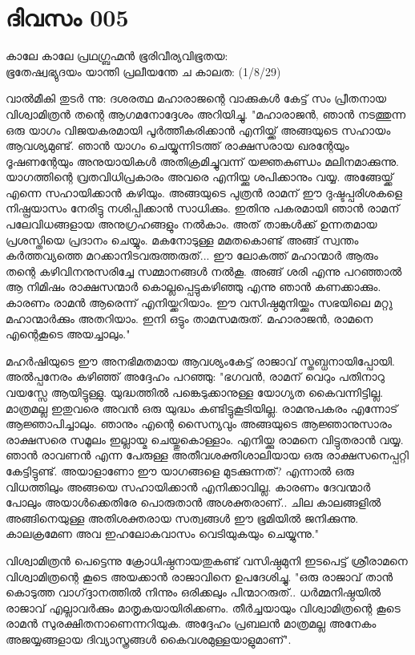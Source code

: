 \newpage
\section{ദിവസം 005}

\begin{center}
കാലേ കാലേ പ്രഥഗ്ബ്രഹ്മൻ ഭൂരിവീര്യവിഭൂതയ:\\
ഭൂതേഷ്വഭ്യുദയം യാന്തി പ്രലീയന്തേ ച കാലത:  (1/8/29)\\
\end{center}

വാല്‍മീകി തുടര്‍ ന്നു: ദശരത്ഥ മഹാരാജന്റെ വാക്കുകള്‍ കേട്ട്‌ സം പ്രീതനായ വിശ്വാമിത്രന്‍ തന്റെ ആഗമനോദ്ദേശം അറിയിച്ചു. "മഹാരാജന്‍, ഞാന്‍ നടത്തുന്ന ഒരു യാഗം വിജയകരമായി പൂര്‍ത്തീകരിക്കാന്‍ എനിയ്ക്ക്‌ അങ്ങയുടെ സഹായം ആവശ്യമുണ്ട്‌. ഞാന്‍ യാഗം ചെയ്യുന്നിടത്ത്‌ രാക്ഷസരായ ഖരന്റേയും ദൂഷണന്റേയും അനുയായികള്‍ അതിക്രമിച്ചുവന്ന് യജ്ഞകുണ്ഡം മലിനമാക്കുന്നു. യാഗത്തിന്റെ വ്രതവിധിപ്രകാരം അവരെ എനിയ്ക്കു ശപിക്കാനും വയ്യ. അങ്ങേയ്ക്ക്‌ എന്നെ സഹായിക്കാന്‍ കഴിയും. അങ്ങയുടെ പുത്രന്‍ രാമന്‌ ഈ ദുഷ്ടപ്പരിശകളെ നിഷ്പ്രയാസം നേരിട്ടു നശിപ്പിക്കാന്‍ സാധിക്കും. ഇതിനു പകരമായി ഞാന്‍ രാമന്‌ പലേവിധങ്ങളായ അനുഗ്രഹങ്ങളും നല്‍കാം. അത്‌ താങ്കള്‍ക്ക്‌ ഉന്നതമായ പ്രശസ്തിയെ പ്രദാനം ചെയ്യും. മകനോടുള്ള മമതകൊണ്ട്‌ അങ്ങ്‌ സ്വന്തം കര്‍ത്തവ്യത്തെ മറക്കാനിടവരുത്തരുത്‌... ഈ ലോകത്ത്‌ മഹാന്മാര്‍ ആരും തന്റെ കഴിവിനനുസരിച്ചേ സമ്മാനങ്ങള്‍ നല്‍കൂ. അങ്ങ്‌ ശരി എന്നു പറഞ്ഞാല്‍ ആ നിമിഷം രാക്ഷസന്മാര്‍ കൊല്ലപ്പെട്ടുകഴിഞ്ഞു എന്നു ഞാന്‍ കണക്കാക്കും. കാരണം രാമന്‍ ആരെന്ന് എനിയ്ക്കറിയാം. ഈ വസിഷ്ഠമുനിയ്ക്കും സഭയിലെ മറ്റു മഹാന്മാര്‍ക്കും അതറിയാം. ഇനി ഒട്ടും താമസമരുത്‌. മഹാരാജന്‍, രാമനെ എന്റെകൂടെ അയച്ചാലും."

മഹര്‍ഷിയുടെ ഈ അനഭിമതമായ ആവശ്യംകേട്ട്‌ രാജാവ്‌ സ്തബ്ധനായിപ്പോയി. അല്‍പ്പനേരം കഴിഞ്ഞ്‌ അദ്ദേഹം പറഞ്ഞു: "ഭഗവന്‍, രാമന്‌ വെറും പതിനാറു വയസ്സേ ആയിട്ടുള്ളു. യുദ്ധത്തില്‍ പങ്കെടുക്കാനുള്ള യോഗ്യത കൈവന്നിട്ടില്ല. മാത്രമല്ല ഇതുവരെ അവന്‍ ഒരു യുദ്ധം കണ്ടിട്ടുകൂടിയില്ല. രാമനുപകരം എന്നോട്‌ ആജ്ഞാപിച്ചാലും. ഞാനും എന്റെ സൈന്യവും അങ്ങയുടെ ആജ്ഞാനുസാരം രാക്ഷസരെ സമൂലം ഇല്ലായ്മ ചെയ്തുകൊള്ളാം. എനിയ്ക്കു രാമനെ വിട്ടുതരാന്‍ വയ്യ. ഞാന്‍ രാവണന്‍ എന്ന പേരുള്ള അതീവശക്തിശാലിയായ ഒരു രാക്ഷസനെപ്പറ്റി കേട്ടിട്ടുണ്ട്‌. അയാളാണോ ഈ യാഗങ്ങളെ മുടക്കുന്നത്‌? എന്നാല്‍ ഒരു വിധത്തിലും അങ്ങയെ സഹായിക്കാന്‍ എനിക്കാവില്ല. കാരണം ദേവന്മാര്‍ പോലും അയാള്‍ക്കെതിരേ പൊരുതാന്‍ അശക്തരാണ്‌.. ചില കാലങ്ങളില്‍ അങ്ങിനെയുള്ള അതിശക്തരായ സത്വങ്ങള്‍ ഈ ഭൂമിയില്‍ ജനിക്കുന്നു. കാലക്രമേണ അവ ഇഹലോകവാസം വെടിയുകയും ചെയ്യുന്നു."

വിശ്വാമിത്രന്‍ പെട്ടെന്നു ക്രോധിഷ്ഠനായതുകണ്ട്‌ വസിഷ്ഠമുനി ഇടപെട്ട്‌ ശ്രീരാമനെ വിശ്വാമിത്രന്റെ കൂടെ അയക്കാന്‍ രാജാവിനെ ഉപദേശിച്ചു. "ഒരു രാജാവ്‌ താന്‍ കൊടുത്ത വാഗ്ദ്ദാനത്തില്‍ നിന്നും ഒരിക്കലും പിന്മാറരുത്‌.. ധര്‍മ്മനിഷ്ഠയില്‍ രാജാവ്‌ എല്ലാവര്‍ക്കും മാതൃകയായിരിക്കണം. തീര്‍ച്ചയായും വിശ്വാമിത്രന്റെ കൂടെ രാമന്‍ സുരക്ഷിതനാണെന്നറിയുക. അദ്ദേഹം പ്രബലന്‍ മാത്രമല്ല അനേകം അജയ്യങ്ങളായ ദിവ്യാസ്ത്രങ്ങള്‍ കൈവശമുള്ളയാളുമാണ്‌". 
